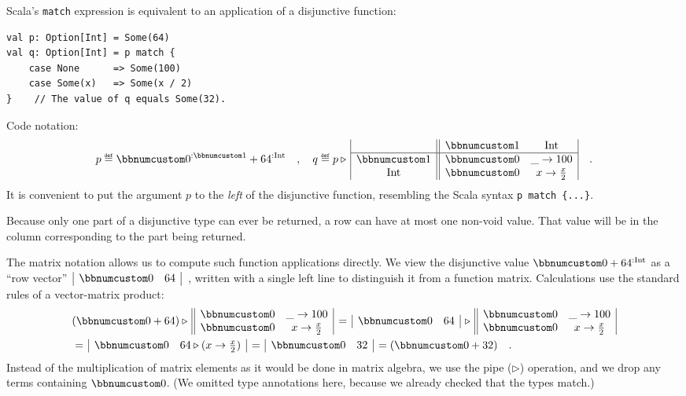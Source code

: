 Scala\textsf{'}s \lstinline!match! expression is equivalent to an application
of a disjunctive function:
\begin{lstlisting}
val p: Option[Int] = Some(64)
val q: Option[Int] = p match {
    case None      => Some(100)
    case Some(x)   => Some(x / 2)
}    // The value of q equals Some(32).
\end{lstlisting}
Code notation:
\[
p\triangleq\bbnum 0^{:\bbnum 1}+64^{:\text{Int}}\quad,\quad q\triangleq p\triangleright\,\begin{array}{|c||cc|}
 & \bbnum 1 & \text{Int}\\
\hline \bbnum 1 & \bbnum 0 & \_\rightarrow100\\
\text{Int} & \bbnum 0 & x\rightarrow\frac{x}{2}
\end{array}\quad.
\]
It is convenient to put the argument $p$ to the \emph{left} of the
disjunctive function, resembling the Scala syntax \lstinline!p match {...}!.

Because only one part of a disjunctive type can ever be returned,
a row can have at most one non-void value. That value will be in the
column corresponding to the part being returned. 

The matrix notation allows us to compute such function applications
directly. We view the disjunctive value $\bbnum 0+64^{:\text{Int}}$
as a \textsf{``}row vector\textsf{''} $\,\begin{array}{|cc|}
\bbnum 0 & 64\end{array}$~, written with a single left line to distinguish it from a function
matrix. Calculations use the standard rules of a vector-matrix product:
\begin{align*}
 & (\bbnum 0+64)\triangleright\,\begin{array}{||cc|}
\bbnum 0 & \_\rightarrow100\\
\bbnum 0 & x\rightarrow\frac{x}{2}
\end{array}\,=\,\begin{array}{|cc|}
\bbnum 0 & 64\end{array}\,\triangleright\,\begin{array}{||cc|}
\bbnum 0 & \_\rightarrow100\\
\bbnum 0 & x\rightarrow\frac{x}{2}
\end{array}\\
 & =\,\begin{array}{|cc|}
\bbnum 0 & 64\triangleright(x\rightarrow\frac{x}{2})\end{array}\,=\,\begin{array}{|cc|}
\bbnum 0 & 32\end{array}\,=(\bbnum 0+32)\quad.
\end{align*}
Instead of the multiplication of matrix elements as it would be done
in matrix algebra, we use the pipe ($\triangleright$) operation,
and we drop any terms containing $\bbnum 0$. (We omitted type annotations
here, because we already checked that the types match.) 

